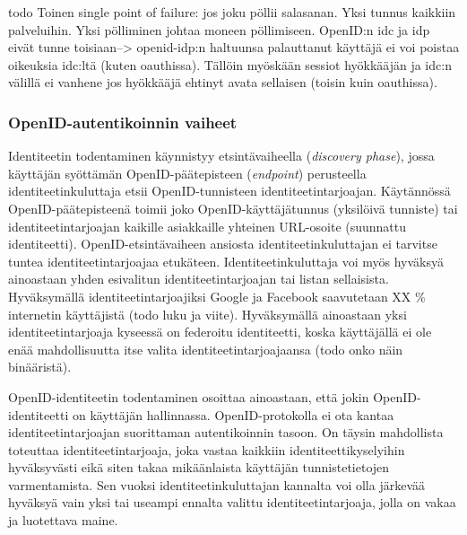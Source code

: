 \documentclass[finnish,gradu]{tktltiki}
\begin{document}
  todo
  Toinen single point of failure: jos joku pöllii salasanan. Yksi tunnus kaikkiin palveluihin. Yksi pölliminen johtaa moneen pöllimiseen. OpenID:n idc ja idp eivät tunne toisiaan--> openid-idp:n haltuunsa palauttanut käyttäjä ei voi poistaa oikeuksia idc:ltä (kuten oauthissa). Tällöin myöskään sessiot hyökkääjän ja idc:n välillä ei vanhene jos hyökkääjä ehtinyt avata sellaisen (toisin kuin oauthissa).



  \subsubsection{OpenID-autentikoinnin vaiheet} %
  \label{ssub:openid_autentikoinnin_vaiheet}

  Identiteetin todentaminen käynnistyy etsintävaiheella (\emph{discovery phase}), jossa käyttäjän syöttämän OpenID-päätepisteen (\emph{endpoint}) perusteella identiteetinkuluttaja etsii OpenID-tunnisteen identiteetintarjoajan. Käytännössä OpenID-päätepisteenä toimii joko OpenID-käyttäjätunnus (yksilöivä tunniste) tai identiteetintarjoajan kaikille asiakkaille yhteinen URL-osoite (suunnattu identiteetti). OpenID-etsintävaiheen ansiosta identiteetinkuluttajan ei tarvitse tuntea identiteetintarjoajaa etukäteen. Identiteetinkuluttaja voi myös hyväksyä ainoastaan yhden esivalitun identiteetintarjoajan tai listan sellaisista. Hyväksymällä identiteetintarjoajiksi Google ja Facebook saavutetaan XX \% internetin käyttäjistä (todo luku ja viite). Hyväksymällä ainoastaan yksi identiteetintarjoaja kyseessä on federoitu identiteetti, koska käyttäjällä ei ole enää mahdollisuutta itse valita identiteetintarjoajaansa (todo onko näin binääristä).

  OpenID-identiteetin todentaminen osoittaa ainoastaan, että jokin OpenID-identiteetti on käyttäjän hallinnassa. OpenID-protokolla ei ota kantaa identiteetintarjoajan suorittaman autentikoinnin tasoon. On täysin mahdollista toteuttaa identiteetintarjoaja, joka vastaa kaikkiin identiteettikyselyihin hyväksyvästi eikä siten takaa mikäänlaista käyttäjän tunnistetietojen varmentamista. Sen vuoksi identiteetinkuluttajan kannalta voi olla järkevää hyväksyä vain yksi tai useampi ennalta valittu identiteetintarjoaja, jolla on vakaa ja luotettava maine.
\end{document}
